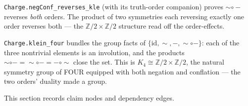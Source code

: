 \begin{theorem}\label{thm:negconf-reverses}\leanok{}
\texttt{Charge.negConf\_reverses\_kle} (with its truth-order companion) proves ${\sim}\circ{-}$ reverses \emph{both} orders. The product of two symmetries each reversing exactly one order reverses both --- the $\mathbb{Z}/2 \times \mathbb{Z}/2$ structure read off the order-effects.
\end{theorem}
\begin{theorem}\label{thm:klein-four-symmetry}\leanok{}
\texttt{Charge.klein\_four} bundles the group facts of $\{\mathrm{id}, \sim, -, {\sim}\circ{-}\}$: each of the three nontrivial elements is an involution, and the products $\sim\circ- = {\sim}\circ{-} = -\circ\sim$ close the set. This is $K_4 \cong \mathbb{Z}/2 \times \mathbb{Z}/2$, the natural symmetry group of FOUR equipped with both negation and conflation --- the two orders' duality made a group.
\end{theorem}

This section records claim nodes and dependency edges.

